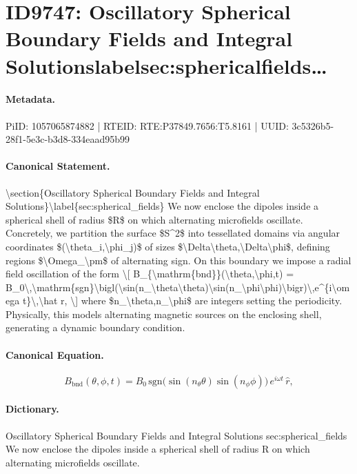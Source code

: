 \section*{ID9747: Oscillatory Spherical Boundary Fields and Integral Solutionslabelsec:sphericalfields…}
\paragraph{Metadata.}
PiID: 1057065874882 | RTEID: RTE:P37849.7656:T5.8161 | UUID: 3c5326b5-28f1-5e3c-b3d8-334eaad95b99

\paragraph{Canonical Statement.}
\textbackslash{}section\{Oscillatory Spherical Boundary Fields and Integral Solutions\}\textbackslash{}label\{sec:spherical\_fields\} We now enclose the dipoles inside a spherical shell of radius \$R\$ on which alternating microfields oscillate. Concretely, we partition the surface \$S\textasciicircum{}2\$ into tessellated domains via angular coordinates \$(\textbackslash{}theta\_i,\textbackslash{}phi\_j)\$ of sizes \$\textbackslash{}Delta\textbackslash{}theta,\textbackslash{}Delta\textbackslash{}phi\$, defining regions \$\textbackslash{}Omega\_\textbackslash{}pm\$ of alternating sign. On this boundary we impose a radial field oscillation of the form \textbackslash{}[ B\_\{\textbackslash{}mathrm\{bnd\}\}(\textbackslash{}theta,\textbackslash{}phi,t) = B\_0\textbackslash{},\textbackslash{}mathrm\{sgn\}\textbackslash{}bigl(\textbackslash{}sin(n\_\textbackslash{}theta\textbackslash{}theta)\textbackslash{}sin(n\_\textbackslash{}phi\textbackslash{}phi)\textbackslash{}bigr)\textbackslash{},e\textasciicircum{}\{i\textbackslash{}omega t\}\textbackslash{},\textbackslash{}hat r, \textbackslash{}] where \$n\_\textbackslash{}theta,n\_\textbackslash{}phi\$ are integers setting the periodicity. Physically, this models alternating magnetic sources on the enclosing shell, generating a dynamic boundary condition.

\paragraph{Canonical Equation.}
\[
B_{\mathrm{bnd}}(\theta,\phi,t) = B_0\,\mathrm{sgn}\bigl(\sin(n_\theta\theta)\sin(n_\phi\phi)\bigr)\,e^{i\omega t}\,\hat r,
\]

\paragraph{Dictionary.}
Oscillatory Spherical Boundary Fields and Integral Solutions sec:spherical\_fields We now enclose the dipoles inside a spherical shell of radius R on which alternating microfields oscillate.

